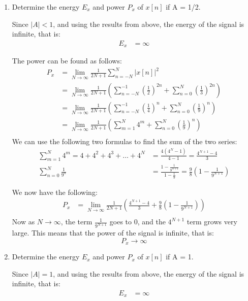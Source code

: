 \documentclass{article}
\begin{document}
\begin{enumerate}[label=\alph*.]
    \item Determine the energy $E_x$ and power $P_x$ of $x[n]$ if A = 1/2.
    
    Since $|A| < 1$, and using the results from above, the energy of the signal is infinite, that is:
    \begin{align*}
        E_x &= \infty
    \end{align*}

    The power can be found as follows:
    \begin{align*}
        P_x &= \lim_{N \to \infty} \frac{1}{2N + 1} \sum_{n=-N}^{N} |x[n]|^2 \\
        &= \lim_{N \to \infty} \frac{1}{2N + 1} \left(\sum_{n=-N}^{-1} \left(\frac{1}{2}\right)^{2n} + \sum_{n=0}^{N} \left(\frac{1}{3}\right)^{2n}\right) \\
        &= \lim_{N \to \infty} \frac{1}{2N + 1} \left(\sum_{n=-N}^{-1} \left(\frac{1}{4}\right)^{n} + \sum_{n=0}^{N} \left(\frac{1}{9}\right)^{n}\right) \\   
        &= \lim_{N \to \infty} \frac{1}{2N + 1} \left(\sum_{m=1}^{N} 4^m + \sum_{n=0}^{N} \left(\frac{1}{9}\right)^{n}\right) \\
    \end{align*}
    We can use the following two formulas to find the sum of the two series:
    \begin{align*}
        \sum_{m=1}^{N} 4^m = 4 + 4^2 + 4^3 + \ldots + 4^N &= \frac{4(4^N - 1)}{4 - 1} = \frac{4^{N+1} - 4}{3} \\
        \sum_{n=0}^{N} \frac{1}{9^n} &= \frac{1 - \frac{1}{9^{N+1}}}{1 - \frac{1}{9}} = \frac{9}{8}\left(1 - \frac{1}{9^{N+1}}\right)
    \end{align*}

    We now have the following:
    \begin{align*}
        P_x &= \lim_{N \to \infty} \frac{1}{2N + 1} \left(\frac{4^{N+1} - 4}{3} + \frac{9}{8}\left(1 - \frac{1}{9^{N+1}}\right)\right) \\
    \end{align*}
    Now as $N \to \infty$, the term $\frac{1}{9^{N+1}}$ goes to 0, and the $4^{N+1}$ term grows very large. This means that the power of the signal is infinite, that is:
    \[
        P_x \rightarrow \infty
    \]
    \item Determine the energy $E_x$ and power $P_x$ of $x[n]$ if A = 1.
    
    Since $|A| = 1$, and using the results from above, the energy of the signal is infinite, that is:
    \begin{align*}
        E_x &= \infty
    \end{align*}


\end{enumerate}
\end{document}

